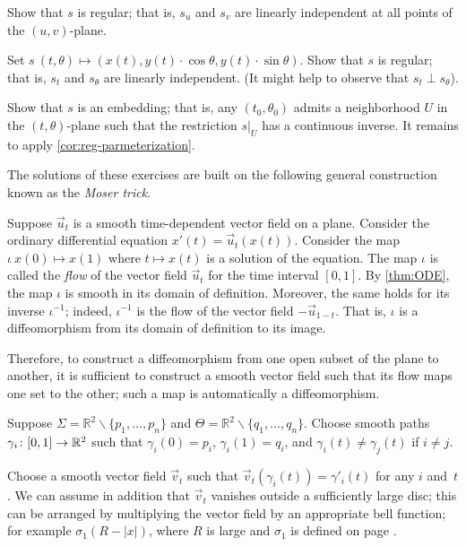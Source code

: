 \begin{multicols}{2}
Show that $s$ is regular; that is, $s_u$ and $s_v$ are linearly independent at all points of the $(u,v)$-plane.

Set
$s\:(t,\theta)\mapsto (x(t), y(t)\cdot\cos\theta,y(t)\cdot\sin\theta)$.
Show that $s$ is regular; that is, $s_t$ and $s_\theta$ are linearly independent.
(It might help to observe that $s_t\perp s_\theta$).

Show that $s$ is an embedding;
that is, any $(t_0,\theta_0)$ admits a neighborhood $U$ in the $(t,\theta)$-plane such that the restriction $s|_U$ has a continuous inverse.
It remains to apply \ref{cor:reg-parmeterization}.

The solutions of these exercises are built on the following general construction known as the \emph{Moser trick}.

Suppose $\vec u_t$ is a smooth time-dependent vector field on a plane.
Consider the ordinary differential equation $x'(t)=\vec u_t(x(t))$.
Consider the map $\iota\:x(0)\mapsto x(1)$ where $t\mapsto x(t)$ is a solution of the equation.
The map $\iota$ is called the \emph{flow} of the vector field $\vec u_t$ for the time interval $[0,1]$.
By \ref{thm:ODE}, the map $\iota$ is smooth in its domain of definition.
Moreover, the same holds for its inverse $\iota^{-1}$;
indeed, $\iota^{-1}$ is the flow of the vector field $-\vec u_{1-t}$.
That is, $\iota$ is a diffeomorphism from its domain of definition to its image. 


Therefore, to construct a diffeomorphism from one open subset of the plane to another, it is sufficient to construct a smooth vector field such that its flow maps one set to the other;
such a map is automatically a diffeomorphism.


Suppose $\Sigma=\mathbb{R}^2\backslash\{p_1,\dots,p_n\}$ and $\Theta=\mathbb{R}^2\backslash\{q_1,\dots,q_n\}$.
Choose smooth paths $\gamma_i\:[0,1]\z\to \mathbb{R}^2$ such that $\gamma_i(0)=p_i$,
$\gamma_i(1)=q_i$, and $\gamma_i(t)\ne \gamma_j(t)$ if $i\ne j$.

Choose a smooth vector field $\vec v_t$ such that $\vec v_t(\gamma_i(t))=\gamma'_i(t)$ for any $i$ and~$t$.
We can assume in addition that $\vec v_t$ vanishes outside a sufficiently large disc; this can be arranged by multiplying the vector field by an appropriate bell function;
for example $\sigma_1(R-|x|)$, where $R$ is large and $\sigma_1$ is defined on page \pageref{page:sigma-function}.


\end{multicols}
